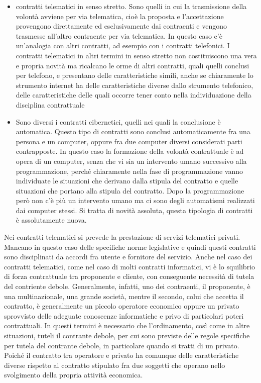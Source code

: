 \begin{itemize}
    \item contratti telematici in senso stretto. Sono quelli in cui la trasmissione della volontà avviene per via telematica, cioè la proposta e l'accettazione provengono direttamente ed esclusivamente dai contraenti e vengono trasmesse all'altro contraente per via telematica. In questo caso c'è un'analogia con altri contratti, ad esempio con i contratti telefonici. I contratti telematici in altri termini in senso stretto non costituiscono una vera e propria novità ma ricalcano le orme di altri contratti, quali quelli conclusi per telefono, e presentano delle caratteristiche simili, anche se chiaramente lo strumento internet ha delle caratteristiche diverse dallo strumento telefonico, delle caratteristiche delle quali occorre tener conto nella individuazione della disciplina contrattuale
    \item Sono diversi i contratti cibernetici, quelli nei quali la conclusione è automatica. Questo tipo di contratti sono conclusi automaticamente fra una persona e un computer, oppure fra due computer diversi considerati parti contrapposte. In questo caso la formazione della volontà contrattuale è ad opera di un computer, senza che vi sia un intervento umano successivo alla programmazione, perché chiaramente nella fase di programmazione vanno individuate le situazioni che derivano dalla stipula del contratto e quelle situazioni che portano alla stipula del contratto. Dopo la programmazione però non c'è più un intervento umano ma ci sono degli automatismi realizzati dai computer stessi. Si tratta di novità assoluta, questa tipologia di contratti è assolutamente nuova.
\end{itemize}

Nei contratti telematici si prevede la prestazione di servizi telematici privati. Mancano in questo caso delle specifiche norme legislative e quindi questi contratti sono disciplinati da accordi fra utente e fornitore del servizio. Anche nel caso dei contratti telematici, come nel caso di molti contratti informatici, vi è lo squilibrio di forza contrattuale tra proponente e cliente, con conseguente necessità di tutela del contriente debole. Generalmente, infatti, uno dei contraenti, il proponente, è una multinazionale, una grande società, mentre il secondo, colui che accetta il contratto, è generalmente un piccolo operatore economico oppure un privato sprovvisto delle adeguate conoscenze informatiche e privo di particolari poteri contrattuali. In questi termini è necessario che l'ordinamento, così come in altre situazioni, tuteli il contrante debole, per cui sono previste delle regole specifiche per tutela del contrante debole, in particolare quando si tratti di un privato. Poiché il contratto tra operatore e privato ha comunque delle caratteristiche diverse rispetto al contratto stipulato fra due soggetti che operano nello svolgimento della propria attività economica.

